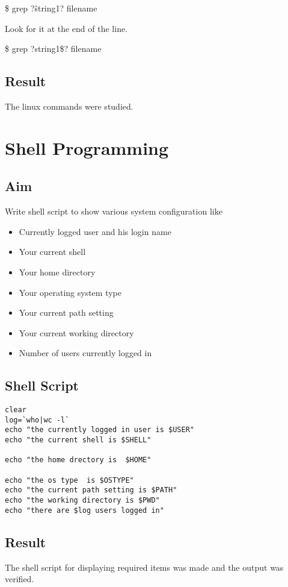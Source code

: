 \documentclass{article}
\begin{document}
				\hspace{10mm}\$ grep ?\^string1? filename
				
				Look for it at the end of the line.
				
				\hspace{10mm}\$ grep ?string1\$? filename
				

\subsection{Result}
The linux commands were studied.

\newpage

\section{Shell Programming}
\subsection{Aim}
Write shell script to show various system configuration like
\begin{itemize}
\item Currently logged user and his login name
\item Your current shell
\item Your home directory
\item Your operating system type
\item Your current path setting
\item Your current working directory
\item Number of users currently logged in
\end{itemize}

\subsection{Shell Script}
\begin{verbatim}
clear
log=`who|wc -l`
echo "the currently logged in user is $USER"
echo "the current shell is $SHELL"

echo "the home drectory is  $HOME"

echo "the os type  is $OSTYPE"
echo "the current path setting is $PATH"
echo "the working directory is $PWD"
echo "there are $log users logged in"
\end{verbatim}

\subsection{Result}
The shell script for displaying required items was made and the output was verified.
\end{document}

